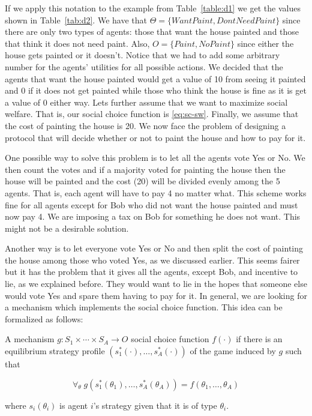 If we apply this notation to the example from Table~\ref{table:d1} we
get the values shown in Table~\ref{tab:d2}. We have that
$\Theta=\{WantPaint, DontNeedPaint\}$ since there are only two types
of agents: those that want the house painted and those that think it
does not need paint. Also, $O=\{Paint, NoPaint\}$ since either the
house gets painted or it doesn't. Notice that we had to add some
arbitrary number for the agents' utilities for all possible actions.
We decided that the agents that want the house painted would get a
value of 10 from seeing it painted and 0 if it does not get painted
while those who think the house is fine as it is get a value of 0
either way. Lets further assume that we want to maximize social
welfare. That is, our social choice function is \eqref{eq:sc-sw}.
Finally, we assume that the cost of painting the house is 20.  We now
face the problem of designing a protocol that will decide whether or
not to paint the house and how to pay for it.  

One possible way to solve this problem is to let all the agents vote
Yes or No.  We then count the votes and if a majority voted for
painting the house then the house will be painted and the cost (20)
will be divided evenly among the 5 agents. That is, each agent will
have to pay 4 no matter what. This scheme works fine for all agents
except for Bob who did not want the house painted and must now pay 4.
We are imposing a tax on Bob for something he does not want. This
might not be a desirable solution.

Another way is to let everyone vote Yes or No and then split the cost
of painting the house among those who voted Yes, as we discussed
earlier.  This seems fairer but it has the problem that it gives all
the agents, except Bob, and incentive to lie, as we explained before.
They would want to lie in the hopes that someone else would vote Yes
and spare them having to pay for it. In general, we are looking for a
mechanism which implements the social choice function. This idea can
be formalized as follows:

\begin{definition}[$g$ Implements $f$]
  \label{def:implements}
  A mechanism $g: S_1 \times \cdots \times S_A \rightarrow O$
   social choice function $f(\cdot)$ if there is
  an equilibrium strategy profile $(s_1^*(\cdot),\ldots
  ,s_A^*(\cdot))$ of the game induced by $g$ such that
  
  \[\forall_{\theta} \; g(s_1^*(\theta_1),\ldots ,s_A^*(\theta_A)) 
  = f(\theta_1,\ldots ,\theta_A)\]

  where $s_i(\theta_i)$ is agent $i$'s strategy given that it is
  of type $\theta_i$.
\end{definition}

